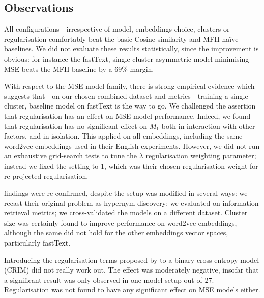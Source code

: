 \subsection{Observations}

All configurations - irrespective of model, embeddings choice, clusters or regularisation comfortably beat the basic Cosine similarity and \ac{MFH} na\"ive baselines.  We did not evaluate these results statistically, since the improvement is obvious: for instance the fastText, single-cluster asymmetric model minimising \ac{MSE} beats the \ac{MFH} baseline by a 69\% margin.

With respect to the \ac{MSE} model family, there is strong empirical evidence which suggests that - on our chosen combined dataset and metrics - training a single-cluster, baseline model on fastText is the way to go.  We challenged the \citet{ustalov2017negative} assertion that regularisation has an effect on \ac{MSE} model performance.  Indeed, we found that regularisation has no significant effect on $M_1$ both in interaction with other factors, and in isolation.  This applied on all embeddings, including the same word2vec embeddings \citeauthor{ustalov2017negative} used in their English experiments.  However, we did not run an exhaustive grid-search tests to tune the $\lambda$ regularisation weighting parameter; instead we fixed the setting to 1, which was their chosen regularisation weight for re-projected regularisation.

\citet{Fu2014} findings were re-confirmed, despite the setup was modified in several ways: we recast their original problem as hypernym discovery; we evaluated on information retrieval metrics; we cross-validated the models on a different dataset.  Cluster size was certainly found to improve performance on word2vec embeddings, although the same did not hold for the other embeddings vector spaces, particularly fastText.

Introducing the regularisation terms proposed by \citet{ustalov2017negative} to a binary cross-entropy model (CRIM) did not really work out.  The effect was moderately negative, insofar that a significant result was only observed in one model setup out of 27.  Regularisation was not found to have any significant effect on \ac{MSE} models either.  

